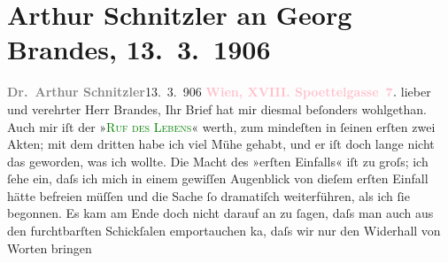 

               \section[Arthur Schnitzler an Georg Brandes, 13. 3. 1906]{ Arthur Schnitzler an Georg Brandes, 13. 3. 1906}\nopagebreak{}\rehead{ }\normalsize\beginnumbering{} \toendnotes[C]{\smallbreak\pagebreak[2]} 
\toendnotes[C]{\smallbreak}\pstart
           \noindent{}{\pb}\textcolor{gray}{\textbf{Dr. Arthur Schnitzler}}\hfill 13. 3. 906\pend
           \pstart
           \textcolor{gray}{\textbf{\textcolor{pink}{Wien, XVIII. Spoettelgasse 7}{}\ledrightnote{\textcolor{pink}{Edmund-Weiß-Gasse}}.}}\pend
           \pstart{}lieber und verehrter Herr Brandes,\pend\pstart
           Ihr Brief hat mir diesmal beſonders wohlgethan. Auch mir iſt der »\textcolor{green}{\textsc{Ruf des Lebens}}{}\ledrightnote{\textcolor{green}{Der Ruf des Lebens. Schauspiel in drei Akten}}« werth, zum mindeſten in ſeinen erſten zwei Akten; mit dem dritten habe ich
               viel Mühe gehabt, und er iſt doch lange nicht das geworden, was ich wollte. Die Macht
               des »erſten Einfalls« iſt zu groſs; ich ſehe ein, daſs ich {\pb}mich in einem gewiſſen Augenblick von dieſem
               erſten Einfall hätte befreien \introOben{}müſſen\introOben{} und die Sache ſo
               dramatiſch weiterführen, als ich ſie begonnen. Es kam am Ende doch nicht darauf an zu
               ſagen, daſs man auch aus den furchtbarſten Schickſalen emportauchen ka{\geminationn}, daſs wir nur den Widerhall von Worten bringen
